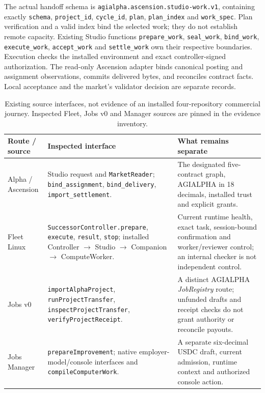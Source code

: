 \documentclass[11pt,letterpaper]{article}
\begin{document}
The actual handoff schema is \texttt{agialpha.\allowbreak{}ascension.\allowbreak{}studio-\allowbreak{}work.\allowbreak{}v1}, containing exactly
\texttt{schema}, \texttt{project\_\allowbreak{}id}, \texttt{cycle\_\allowbreak{}id}, \texttt{plan},
\texttt{plan\_\allowbreak{}index} and \texttt{work\_\allowbreak{}spec}. Plan verification and a valid index bind the selected work; they do not establish remote capacity. Existing Studio functions
\texttt{prepare\_\allowbreak{}work}, \texttt{seal\_\allowbreak{}work}, \texttt{bind\_\allowbreak{}work},
\texttt{execute\_\allowbreak{}work}, \texttt{accept\_\allowbreak{}work} and \texttt{settle\_\allowbreak{}work}
own their respective boundaries. Execution checks the installed environment and exact controller-signed authorization. The read-only Ascension adapter binds canonical posting and assignment observations, commits delivered bytes, and reconciles contract facts. Local acceptance and the market's validator decision are separate records.

\begin{table}[htbp]
\centering\small
\begin{tabularx}{\linewidth}{@{}p{.20\linewidth}XX@{}}
\toprule
Route / source & Inspected interface & What remains separate\\
\midrule
Alpha / Ascension & Studio request and \texttt{MarketReader}; \texttt{bind\_\allowbreak{}assignment}, \texttt{bind\_\allowbreak{}delivery}, \texttt{import\_\allowbreak{}settlement}. & The designated five-contract graph, AGIALPHA in 18 decimals, installed trust and explicit grants.\\
Fleet Linux & \texttt{SuccessorController.\allowbreak{}prepare}, \texttt{execute}, \texttt{result}, \texttt{stop}; installed Controller $\rightarrow$ Studio $\rightarrow$ Companion $\rightarrow$ ComputeWorker. & Current runtime health, exact task, session-bound confirmation and worker/reviewer control; an internal checker is not independent control.\\
Jobs v0 & \texttt{importAlphaProject}, \texttt{runProjectTransfer}, \texttt{inspectProjectTransfer}, \texttt{verifyProjectReceipt}. & A distinct AGIALPHA \emph{JobRegistry} route; unfunded drafts and receipt checks do not grant authority or reconcile payouts.\\
Jobs Manager & \texttt{prepareImprovement}; native employer-model/console interfaces and \texttt{compileComputerWork}. & A separate six-decimal USDC draft, current admission, runtime context and authorized console action.\\
\bottomrule
\end{tabularx}
\caption{Existing source interfaces, not evidence of an installed four-repository commercial journey. Inspected Fleet, Jobs v0 and Manager sources are pinned in the evidence inventory.}
\end{table}
\end{document}
